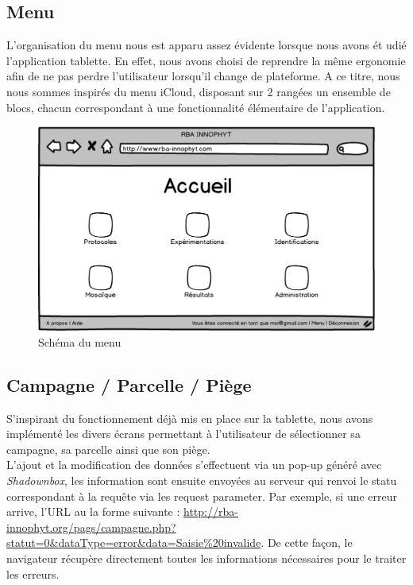 \documentclass[twoside]{EPURapport}
\begin{document}
		\subsection{Menu}
		
			L'organisation du menu nous est apparu assez évidente lorsque nous avons ét
			udié l'application tablette. En effet, nous avons choisi de reprendre la même ergonomie afin de ne pas perdre l'utilisateur lorsqu'il change de plateforme. A ce titre, nous nous sommes inspirés du menu iCloud, disposant sur 2 rangées un ensemble de blocs, chacun correspondant à une fonctionnalité élémentaire de l'application.\\
			
			\begin{figure}[hbtp]
			\centering
			\includegraphics[scale=0.5]{images/menu.png}
			\caption{Schéma du menu}
		\end{figure}	
		
		\subsection{Campagne / Parcelle / Piège}
		
		S'inspirant du fonctionnement déjà mis en place sur la tablette, nous avons implémenté les divers écrans permettant à l'utilisateur de sélectionner sa campagne, sa parcelle ainsi que son piège.\\
		
		L'ajout et la modification des données s'effectuent via un pop-up généré avec \emph{Shadownbox}, les information sont ensuite envoyées au serveur qui renvoi le statu correspondant à la requête via les request parameter. Par exemple, si une erreur arrive, l'URL au la forme suivante : \url{http://rba-innophyt.org/pags/campagne.php?statut=0&dataType=error&data=Saisie\%20invalide}. De cette façon, le navigateur récupère directement toutes les informations nécessaires pour le traiter les erreurs.\\
		
\end{document}
